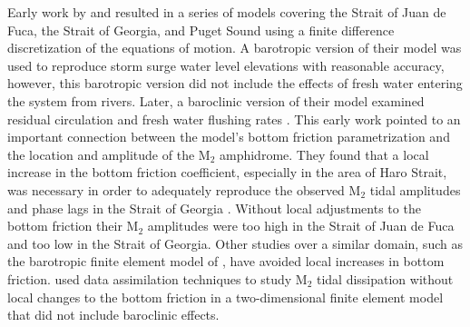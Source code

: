 \documentclass[pdftex,10pt]{article}
\begin{document}
Early work by \citet{crean1988mathematical,crean1988numerical} and \citet{stronach1993update} resulted in a series of models covering the Strait of Juan de Fuca, the Strait of Georgia, and Puget Sound using a finite difference discretization of the equations of motion. A barotropic version of their model was used to reproduce storm surge water level elevations with reasonable accuracy, however, this barotropic version did not include the effects of fresh water entering the system from rivers. Later, a baroclinic version of their model examined residual circulation and fresh water flushing rates \citep{stronach1993update, marinone1996model}. This early work pointed to an important connection between the model's bottom friction parametrization and the location and amplitude of the M$_2$ amphidrome. They found that a local increase in the bottom friction coefficient, especially in the area of Haro Strait, was necessary in order to adequately reproduce the observed M$_2$ tidal amplitudes and phase lags in the Strait of Georgia \citep{stronach1993update}. Without local adjustments to the bottom friction their M$_2$ amplitudes were too high in the Strait of Juan de Fuca and too low in the Strait of Georgia.  Other studies over a similar domain, such as the barotropic finite element model of \citet{foreman1995tidal}, have avoided local increases in bottom friction. \citet{foreman2004m} used data assimilation techniques to study M$_2$ tidal dissipation without local changes to the bottom friction in a two-dimensional finite element model that did not include baroclinic effects. 
\end{document}
